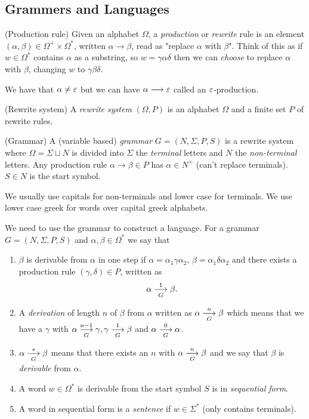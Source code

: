 \documentclass[tikx, border = 10pt]{article}
\begin{document}
\subsection{Grammers and Languages}
\begin{definition}
	(Production rule) Given an alphabet $ \Omega $, a \textit{production} or \textit{rewrite} rule is an element $ (\alpha,\beta)\in \Omega^+\times \Omega^* $, written $ \alpha \longrightarrow \beta $, read as "replace $ \alpha $ with $ \beta $". Think of this as if $ w\in \Omega^* $ contains $ \alpha $ as a substring, so $ w = \gamma \alpha\delta $ then we can \textit{choose} to replace $ \alpha $ with $ \beta $, changing $ w $ to $ \gamma\beta\delta $.
\end{definition}
\begin{remark}
	We have that $ \alpha\ne\ep $ but we can have $ \alpha\longrightarrow \ep $ called an $ \ep $-production.
\end{remark}
\begin{definition}
	(Rewrite system) A \textit{rewrite system} $ (\Omega,P) $ is an alphabet $ \Omega $ and a finite set $ P $ of rewrite rules.
\end{definition}
\begin{definition}
	(Grammar) A (variable based) \textit{grammar} $ G = (N,\Sigma, P,S) $ is a rewrite system where $ \Omega = \Sigma \sqcup N $ is divided into $ \Sigma $ the \textit{terminal} letters and $ N $ the \textit{non-terminal} letters. Any production rule $ \alpha\to\beta\in P $ has $ \alpha\in N^+ $ (can't replace terminals). $ S\in N $ is the start symbol.
\end{definition}
\begin{remark}
  We usually use capitals for non-terminals and lower case for terminals. We use lower case greek for words over capital greek alphabets.
\end{remark}
We need to use the grammar to construct a language. For a grammar $ G = (N,\Sigma, P,S) $ and $ \alpha,\beta \in \Omega^* $ we say that 
\begin{enumerate}
	\item $ \beta $ is derivable from $ \alpha $ in one step if $ \alpha = \alpha_1\gamma\alpha_2 $, $ \beta = \alpha_1\delta\alpha_2 $ and there exists a production rule $ (\gamma,\delta) \in P $, written as
		\[
			\alpha \arr{G}{1} \beta.
		\]
	\item A \textit{derivation} of length $ n $ of $ \beta $ from $ \alpha $ written as $ \alpha\arr{G}{n}\beta $ which means that we have a $ \gamma $ with $ \alpha\arr{G}{n-1}\gamma, \gamma\arr{G}{1} \beta $ and $ \alpha\arr G0 \alpha $.
	\item $ \alpha \arr G* \beta $ means that there exists an $ n $ with $ \alpha \arr Gn \beta $ and we say that $ \beta $ is \textit{derivable} from $ \alpha $.
	\item A word $ w\in \Omega^* $ is derivable from the start symbol $ S $ is in \textit{sequential form}.
	\item A word in sequential form is a \textit{sentence} if $ w\in \Sigma^* $ (only contains terminals).
\end{enumerate}
\end{document}
